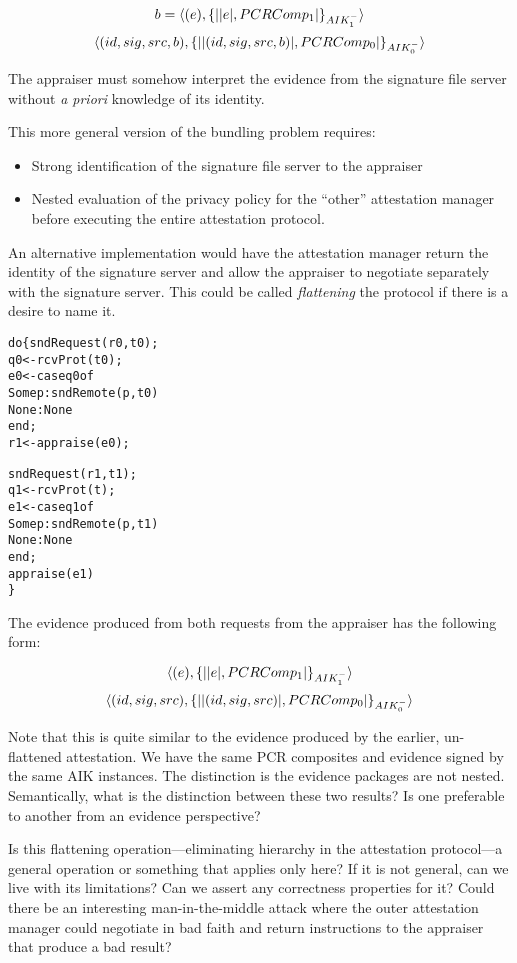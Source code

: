 \documentclass[10pt]{article}
\begin{document}
\[b=\langle (e),\{\lvert \lvert e \rvert,PCRComp_1\rvert\}_{AIK_1^{-}}\rangle\]
\[\langle (id,sig,src,b),\{\lvert \lvert (id,sig,src,b) \rvert,PCRComp_0\rvert\}_{AIK_0^{-}}\rangle\]

The appraiser must somehow interpret the evidence from the signature
file server without \emph{a priori} knowledge of its identity.

This more general version of the bundling problem requires:

\begin{itemize}
  \parskip=0pt\itemsep=0pt
\item Strong identification of the signature file server to the appraiser
\item Nested evaluation of the privacy policy for the ``other''
  attestation manager before executing the entire attestation
  protocol.
\end{itemize}

An alternative implementation would have the attestation manager
return the identity of the signature server and allow the appraiser to
negotiate separately with the signature server.  This could be called
\emph{flattening} the protocol if there is a desire to name it.

\begin{alltt}
  do \{ sndRequest(r0,t0);
       q0 <- rcvProt(t0);
       e0 <- case q0 of
               Some p : sndRemote(p,t0)
               None : None
             end;
       r1 <- appraise(e0);
       
       sndRequest(r1,t1);
       q1 <- rcvProt(t);
       e1 <- case q1 of
               Some p : sndRemote(p,t1)
               None : None
             end;
       appraise(e1)
  \}
\end{alltt}

The evidence produced from both requests from the appraiser has the
following form:

\[\langle (e),\{\lvert \lvert e \rvert,PCRComp_1\rvert\}_{AIK_1^{-}}\rangle\]
\[\langle (id,sig,src),\{\lvert \lvert (id,sig,src) \rvert,PCRComp_0\rvert\}_{AIK_0^{-}}\rangle\]

Note that this is quite similar to the evidence produced by the
earlier, un-flattened attestation.  We have the same PCR composites
and evidence signed by the same AIK instances.  The distinction is the
evidence packages are not nested.  Semantically, what is the
distinction between these two results?  Is one preferable to another
from an evidence perspective?

Is this flattening operation---eliminating hierarchy in the
attestation protocol---a general operation or something that applies
only here?  If it is not general, can we live with its limitations?
Can we assert any correctness properties for it?  Could there be an
interesting man-in-the-middle attack where the outer attestation
manager could negotiate in bad faith and return instructions to the
appraiser that produce a bad result?
\end{document}
